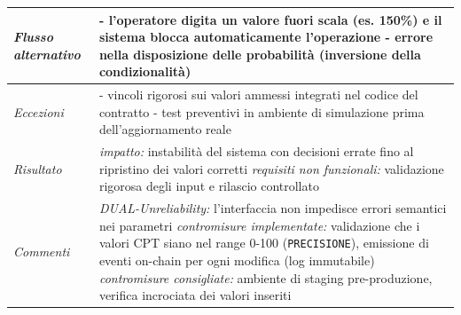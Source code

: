 \begin{longtable}{| >{\columncolor{misuseCol}}p{} | p{} |}
\hline
\textit{Flusso alternativo} & - l'operatore digita un valore fuori scala (es. 150\%) e il sistema blocca automaticamente l'operazione \newline - errore nella disposizione delle probabilità (inversione della condizionalità) \\
\hline
\textit{Eccezioni} & - vincoli rigorosi sui valori ammessi integrati nel codice del contratto \newline - test preventivi in ambiente di simulazione prima dell'aggiornamento reale \\
\hline
\textit{Risultato} & \textit{impatto:} instabilità del sistema con decisioni errate fino al ripristino dei valori corretti \newline \textit{requisiti non funzionali:} validazione rigorosa degli input e rilascio controllato \\
\hline
\textit{Commenti} & \textit{DUAL-Unreliability:} l'interfaccia non impedisce errori semantici nei parametri \newline \textit{contromisure implementate:} validazione che i valori CPT siano nel range 0-100 (\texttt{PRECISIONE}), emissione di eventi on-chain per ogni modifica (log immutabile) \newline \textit{contromisure consigliate:} ambiente di staging pre-produzione, verifica incrociata dei valori inseriti \\
\hline
\end{longtable}


